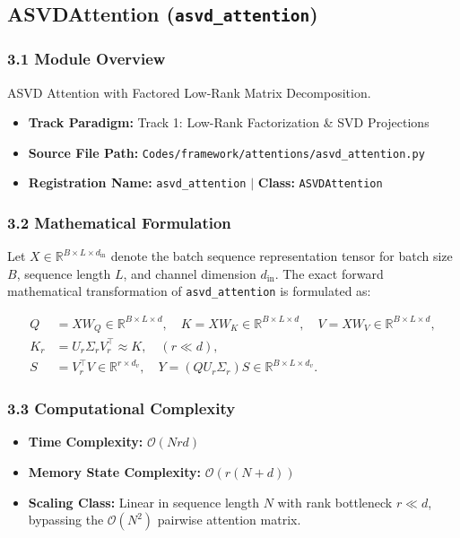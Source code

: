 \subsection{ASVDAttention (\texttt{asvd\_attention})}
\label{sec:app_module_asvd_attention}

\subsubsection*{3.1 Module Overview}
ASVD Attention with Factored Low-Rank Matrix Decomposition.
\begin{itemize}
    \item \textbf{Track Paradigm:} Track 1: Low-Rank Factorization \& SVD Projections
    \item \textbf{Source File Path:} \texttt{Codes/framework/attentions/asvd\_attention.py}
    \item \textbf{Registration Name:} \texttt{asvd\_attention} $\mid$ \textbf{Class:} \texttt{ASVDAttention}
\end{itemize}

\subsubsection*{3.2 Mathematical Formulation}
Let $X \in \mathbb{R}^{B \times L \times d_{\text{in}}}$ denote the batch sequence representation tensor for batch size $B$, sequence length $L$, and channel dimension $d_{\text{in}}$. The exact forward mathematical transformation of \texttt{asvd\_attention} is formulated as:

\begin{align}
Q &= X W_Q \in \mathbb{R}^{B \times L \times d}, \quad K = X W_K \in \mathbb{R}^{B \times L \times d}, \quad V = X W_V \in \mathbb{R}^{B \times L \times d}, \\
K_r &= U_r \Sigma_r V_r^\top \approx K, \quad (r \ll d), \\
S &= V_r^\top V \in \mathbb{R}^{r \times d_v}, \quad Y = (Q U_r \Sigma_r) S \in \mathbb{R}^{B \times L \times d_v}.
\end{align}


\subsubsection*{3.3 Computational Complexity}
\begin{itemize}
    \item \textbf{Time Complexity:} $\mathcal{O}(N r d)$
    \item \textbf{Memory State Complexity:} $\mathcal{O}(r(N + d))$
    \item \textbf{Scaling Class:} Linear in sequence length $N$ with rank bottleneck $r \ll d$, bypassing the $\mathcal{O}(N^2)$ pairwise attention matrix.
\end{itemize}

